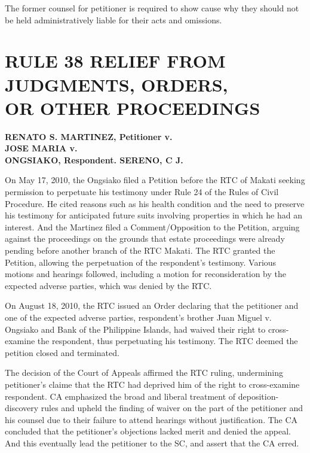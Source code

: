 \documentclass[
12pt,
oneside,
onehalfspacing,
headsepline
]{DigestCollection}
\begin{document}
The former counsel for petitioner is required to show cause why they should not be held administratively liable for their acts and omissions. 

\chapter{RULE 38 RELIEF FROM JUDGMENTS, ORDERS,\\ OR OTHER PROCEEDINGS}
\label{ca1448e0-0a16-11ef-932c-63c852f65e48}


\label{4585f890-0a1a-11ef-932c-63c852f65e48}


\noindent\textbf{RENATO S. MARTINEZ, Petitioner v. \\JOSE MARIA v. \\ONGSIAKO, Respondent. SERENO, C J.}\vspace{0.4cm}

On May 17, 2010, the Ongsiako filed a Petition before the RTC of Makati seeking permission to perpetuate his testimony under Rule 24 of the Rules of Civil Procedure. He cited reasons such as his health condition and the need to preserve his testimony for anticipated future suits involving properties in which he had an interest. And the Martinez filed a Comment/Opposition to the Petition, arguing against the proceedings on the grounds that estate proceedings were already pending before another branch of the RTC Makati. The RTC granted the Petition, allowing the perpetuation of the respondent's testimony. Various motions and hearings followed, including a motion for reconsideration by the expected adverse parties, which was denied by the RTC.

On August 18, 2010, the RTC issued an Order declaring that the petitioner and one of the expected adverse parties, respondent's brother Juan Miguel v. \\Ongsiako and Bank of the Philippine Islands, had waived their right to cross-examine the respondent, thus perpetuating his testimony. The RTC deemed the petition closed and terminated.

The decision of the Court of Appeals affirmed the RTC ruling, undermining petitioner's claime that the RTC had deprived him of the right to cross-examine respondent. CA emphasized the broad and liberal treatment of deposition-discovery rules and upheld the finding of waiver on the part of the petitioner and his counsel due to their failure to attend hearings without justification. The CA concluded that the petitioner's objections lacked merit and denied the appeal. And this eventually lead the petitioner to the SC, and assert that the CA erred. 
\end{document}
